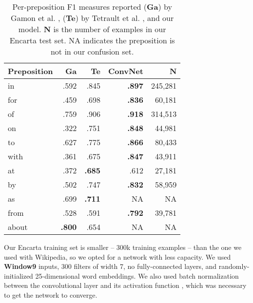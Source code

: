 \begin{table}
\centering
\begin{tabular}{lrrrr}
\toprule
\textbf{Preposition} & \textbf{Ga} & \textbf{Te} & \textbf{ConvNet} & \textbf{N} \\
\midrule
in    & .592 & .845 & \textbf{.897} & 245,281 \\
for   & .459 & .698 & \textbf{.836} & 60,181 \\
of    & .759 & .906 & \textbf{.918} & 314,513 \\
on    & .322 & .751 & \textbf{.848} & 44,981 \\
to    & .627 & .775 & \textbf{.866} & 80,433 \\
with  & .361 & .675 & \textbf{.847} & 43,911 \\
at    & .372 & \textbf{.685} & .612 & 27,181 \\
by    & .502 & .747 & \textbf{.832} & 58,959 \\
as    & .699 & \textbf{.711} & NA  & NA \\
from  & .528 & .591 & \textbf{.792} & 39,781 \\
about & \textbf{.800} & .654 & NA & NA \\
\bottomrule
\end{tabular}
\caption{Per-preposition F1 measures reported (\textbf{Ga}) by Gamon et al. \cite{gamon2008using}, (\textbf{Te}) by Tetrault et al. \cite{tetreault2008native}, and our model.  \textbf{N} is the number of examples in our Encarta test set.  NA indicates the preposition is not in our confusion set.}
\label{tab:EncartaPerPreposition}
\end{table}

Our Encarta training set is smaller -- 300k training examples -- than the one we used with Wikipedia, so we opted for a network with less capacity.  We used \textbf{Window9} inputs, 300 filters of width 7, no fully-connected layers, and randomly-initialized 25-dimensional word embeddings.  We also used batch normalization between the convolutional layer and its activation function \cite{ioffe2015batch}, which was necessary to get the network to converge.

